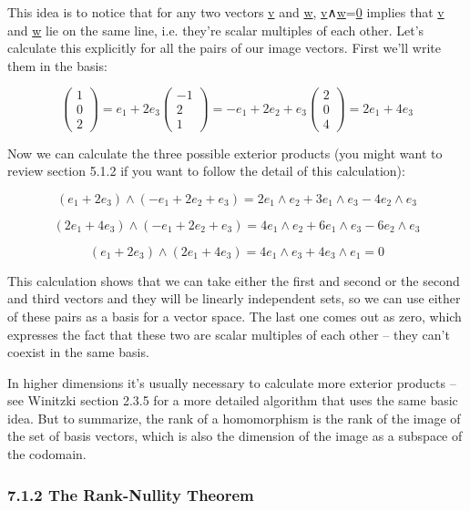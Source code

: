 \documentclass[oneside,english]{amsbook}
\numberwithin{section}{chapter}
\theoremstyle{plain}
\theoremstyle{definition}
\begin{document}
This idea is to notice that for any two vectors \ul{v} and \ul{w},
\ul{v}∧\ul{w}=\ul{0} implies that \ul{v} and \ul{w} lie on the same
line, i.e. they're scalar multiples of each other. Let's calculate this
explicitly for all the pairs of our image vectors. First we'll write
them in the basis:

\[{\begin{pmatrix}
		1 \\
		0 \\
		2
	\end{pmatrix} = e_{1} + 2e_{3}
}{\begin{pmatrix}
		- 1 \\
		2 \\
		1
	\end{pmatrix} = {- e}_{1} + 2e_{2} + e_{3}
}{\begin{pmatrix}
		2 \\
		0 \\
		4
	\end{pmatrix} = 2e_{1} + 4e_{3}}\]

Now we can calculate the three possible exterior products (you might
want to review section 5.1.2 if you want to follow the detail of this
calculation):

\[\left( e_{1} + 2e_{3} \right) \land \left( {- e}_{1} + 2e_{2} + e_{3} \right) = {2e}_{1} \land e_{2} + {3e}_{1} \land e_{3} - 4e_{2} \land e_{3}\]

\[\left( 2e_{1} + 4e_{3} \right) \land \left( {- e}_{1} + 2e_{2} + e_{3} \right) = {4e}_{1} \land e_{2} + {6e}_{1} \land e_{3} - 6e_{2} \land e_{3}\]

\[\left( e_{1} + 2e_{3} \right) \land \left( 2e_{1} + 4e_{3} \right) = {4e}_{1} \land e_{3} + 4e_{3} \land e_{1} = 0\]

This calculation shows that we can take either the first and second or
the second and third vectors and they will be linearly independent sets,
so we can use either of these pairs as a basis for a vector space. The
last one comes out as zero, which expresses the fact that these two are
scalar multiples of each other -- they can't coexist in the same basis.

In higher dimensions it's usually necessary to calculate more exterior
products -- see Winitzki section 2.3.5 for a more detailed algorithm
that uses the same basic idea. But to summarize, the rank of a
homomorphism is the rank of the image of the set of basis vectors, which
is also the dimension of the image as a subspace of the codomain.

\subsubsection{7.1.2 The Rank-Nullity
	Theorem}\label{the-rank-nullity-theorem-2}
\end{document}
